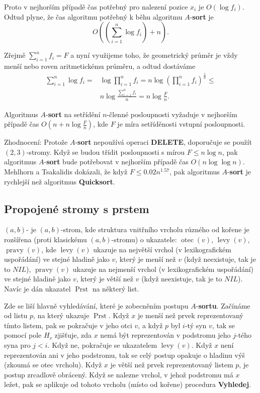 \documentclass[a4paper,12pt]{article}
\def \emph#1{\underbar{#1}}
\DeclareMathOperator*{\otec}{otec}
\DeclareMathOperator*{\levy}{levy}
\DeclareMathOperator*{\pravy}{pravy}
\DeclareMathOperator*{\Prst}{Prst}
\begin{document}
Proto v nejhorším případě čas potřebný pro nalezení 
pozice $x_i$ je $O(\log f_i)$. Odtud plyne, že čas algoritmu potřebný k 
běhu algoritmu $A$-{\bf sort} je 
$$O((\sum_{i=1}^n\log f_i)+n).$$

Zřejmě $\sum_{i=1}^nf_i=F$ a nyní využijeme toho, že geometrický 
průměr je vždy menší nebo roven aritmetickému 
průměru, a odtud dostáváme 
\begin{align*}\sum_{i=1}^n\log f_i=&\log\prod_{i=1}^nf_i=n\log(\prod_{i
=1}^nf_i)^{\frac 1n}\le\\
&n\log\frac {\sum_{i=1}^nf_i}n=n\log\frac Fn.\end{align*}

\begin{veta}Algoritmus $A$-{\bf sort} na setřídění $
n$-členné 
posloupnosti vyžaduje v nejhorším případě čas 
$O(n+n\log\frac Fn)$, kde $F$ je míra setříděnosti vstupní 
posloupnosti.
\end{veta}

Zhodnocení: Protože $A$-{\bf sort} nepoužívá operaci 
{\bf DELETE}, doporučuje se použít $(2,3)$-stromy. Když se 
budou třídit posloupnosti s mírou $F\le n\log n$, pak 
algoritmus $A$-{\bf sort} bude potře\-bo\-vat v nejhorším případě 
čas $O(n\log\log n)$. Mehlhorn a Tsa\-kalidis dokázali, že když 
$F\le 0.02n^{1.57}$, pak algoritmus $A$-{\bf sort} je rychlejší než 
algoritmus {\bf Quicksort}.

\subsection{Propojené stromy s prstem}

\emph{Hladinově} \emph{propojený} $(a,b)$-\emph{strom} \emph{s} 
\emph{prstem} je $(a,b)$-strom, kde struktura vnitřního 
vrcholu různého od kořene je 
rozšířena (proti klasickému $(a,b)$-stromu) o 
ukazatele:\newline 
$\otec(v)$, $\levy(v)$, $\pravy(v)$, kde\newline 
$\levy(v)$ ukazuje na největší vrchol (v lexikografic\-kém 
uspořá\-dá\-ní) ve stejné hladině jako $v$, který je menší než 
$v$ (když neexistuje, tak je to $NIL$),\newline 
$\pravy(v)$ ukazuje na nejmenší vrchol (v lexikografic\-kém 
uspořá\-dá\-ní) ve stejné hladině jako $v$, který je větší než 
$v$ (když ne\-existuje, tak je to $NIL$).\newline 
Navíc je dán ukazatel 
$\Prst$ na některý list. 

Zde se liší hlavně vyhledávání, které je zobecněním 
postupu $A$-{\bf sortu}. Začínáme od listu $p$, na který ukazuje 
$\Prst$. Když $x$ je menší než prvek reprezentovaný tímto 
listem, pak se pokračuje v jeho otci $v$, a když $p$ 
byl $i$-tý syn $v$, tak se pomocí pole $H_v$ zjišťuje, zda $
x$ 
nemá být reprezentován v podstromu jeho $j$-tého syna pro 
$j<i$. Když ne, pokračuje se  ukazatelem $\levy(v)$. 
Když $x$ není reprezentován ani v jeho podstromu, 
tak se celý postup opakuje o hladinu výš (zkoumá se otec vrcholu). 
Když $x$ je větší než prvek reprezentovaný listem $
p$, 
je postup zrcadlově obrácený. Když se nalezne 
vrchol, v jehož podstromu má $x$ ležet, pak se aplikuje od 
tohoto vrcholu (místo od kořene) procedura {\bf Vyhledej}.
\end{document}
